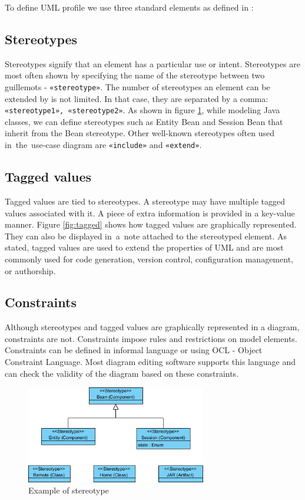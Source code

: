 To define UML profile we use three standard elements as defined in \cite{learningUML}:

\subsection*{Stereotypes} 
Stereotypes signify that an element has a particular use or intent. Stereotypes are most often shown by specifying the name of the stereotype between two guillemots - \texttt{«stereotype»}. The number of stereotypes an element can be extended by is not limited. In that case, they are separated by a comma: \texttt{«stereotype1», «stereotype2»}. 
As shown in figure \ref{fig:stereotype}, while modeling Java classes, we can define stereotypes such as Entity Bean and Session Bean that inherit from the Bean stereotype. 
Other well-known stereotypes often used in~the~use-case diagram are \texttt{«include»} and \texttt{«extend»}.



\subsection*{Tagged values}

Tagged values are tied to stereotypes. A stereotype may have multiple tagged values associated with it. A piece of extra information is provided in a key-value manner. Figure \ref{fig:tagged} shows how tagged values are graphically represented. They can also be displayed in~a~note attached to the stereotyped element. As stated, tagged values are used to extend the properties of UML and are most commonly used for code generation, version control, configuration management, or authorship. 

\subsection*{Constraints}

Although stereotypes and tagged values are graphically represented in a diagram, constraints are not. Constraints impose rules and restrictions on model elements.
Constraints can be defined in informal language or using OCL - Object Constraint Language. Most diagram editing software supports this language and can check the validity of the diagram based on these constraints.

\begin{figure}[H]
    \centering
    \includegraphics[width=0.7\textwidth]{obrazky-figures/05-ejb-profile.png}
    \caption{Example of stereotype}
    \label{fig:stereotype}
\end{figure}

